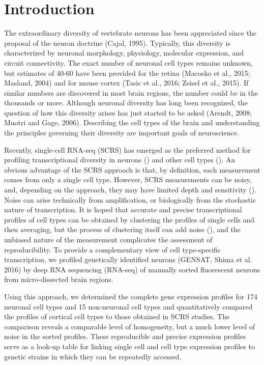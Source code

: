 \section*{Introduction}


The extraordinary diversity of vertebrate neurons has been appreciated since the proposal of the neuron doctrine (Cajal, 1995). Typically, this diversity is characterized by neuronal morphology, physiology, molecular expression, and circuit connectivity. The exact number of neuronal cell types remains unknown, but estimates of 40-60 have been provided for the retina (Macosko et al., 2015; Masland, 2004) and for mouse cortex (Tasic et al., 2016; Zeisel et al., 2015). If similar numbers are discovered in most brain regions, the number could be in the thousands or more. Although neuronal diversity has long been recognized, the question of how this diversity arises has just started to be asked (Arendt, 2008; Muotri and Gage, 2006). Describing the cell types of the brain and understanding the principles governing their diversity are important goals of neuroscience.

Recently, single-cell RNA-seq (SCRS) has emerged as the preferred method for profiling transcriptional diversity in neurons () and other cell types (). An obvious advantage of the SCRS approach is that, by definition, each measurement comes from only a single cell type. However, SCRS measurements can be noisy, and, depending on the approach, they may have limited depth and sensitivity (). Noise can arise technically from amplification, or biologically from the stochastic nature of transcription. It is hoped that accurate and precise transcriptional profiles of cell types can be obtained by clustering the profiles of single cells and then averaging, but the process of clustering itself can add noise (), and the unbiased nature of the measurement complicates the assessment of reproducibility. To provide a complementary view of cell type-specific transcription, we profiled genetically identified neurons (GENSAT, Shima et al. 2016) by deep RNA sequencing (RNA-seq) of manually sorted fluorescent neurons from micro-dissected brain regions.  

Using this approach, we determined the complete gene expression profiles for 174 neuronal cell types and 15 non-neuronal cell types and quantitatively compared the profiles of cortical cell types to those obtained in SCRS studies. The comparison reveals a comparable level of homogeneity, but a much lower level of noise in the sorted profiles. These reproducible and precise expression profiles serve as a look-up table for linking single cell and cell type expression profiles to genetic strains in which they can be repeatedly accessed. 

